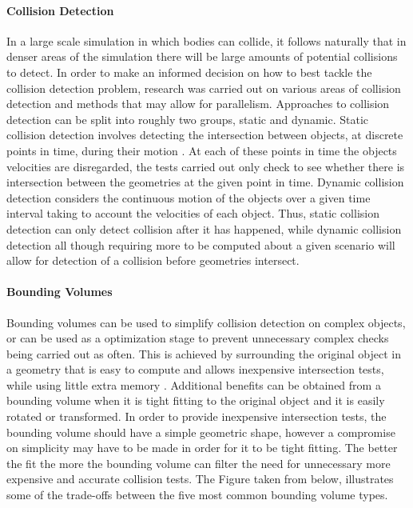 \documentclass[main.tex]{subfiles}
\begin{document}
{{%

\paragraph{Collision Detection} In a large scale simulation in which bodies can collide, it follows naturally that in denser areas of the simulation there will be large amounts of potential collisions to detect. In order to make an informed decision on how to best tackle the collision detection problem, research was carried out on various areas of collision detection and methods that may allow for parallelism. Approaches to collision detection can be split into roughly two groups, static and dynamic. Static collision detection involves detecting the intersection between objects, at discrete points in time, during their motion \cite{Ericson2005}. At each of these points in time the objects velocities are disregarded, the tests carried out only check to see whether there is intersection between the geometries at the given point in time. Dynamic collision detection considers the continuous motion of the objects over a given time interval taking to account the velocities of each object. Thus, static collision detection can only detect collision after it has happened, while dynamic collision detection all though requiring more to be computed about a given scenario will allow for detection of a collision before geometries intersect.

\paragraph{Bounding Volumes} Bounding volumes can be used to simplify collision detection on complex objects, or can be used as a optimization stage to prevent unnecessary complex checks being carried out as often. This is achieved by surrounding the original object in a geometry that is easy to compute and allows inexpensive intersection tests, while using little extra memory \cite{Ericson2005}. Additional benefits can be obtained from a bounding volume when it is tight fitting to the original object and it is easily rotated or transformed. In order to provide inexpensive intersection tests, the bounding volume should have a simple geometric shape, however a compromise on simplicity may have to be made in order for it to be tight fitting. The better the fit the more the bounding volume can filter the need for unnecessary more expensive and accurate collision tests. The Figure taken from \cite{Ericson2005} below, illustrates some of the trade-offs between the five most common bounding volume types.

}}
\end{document}
